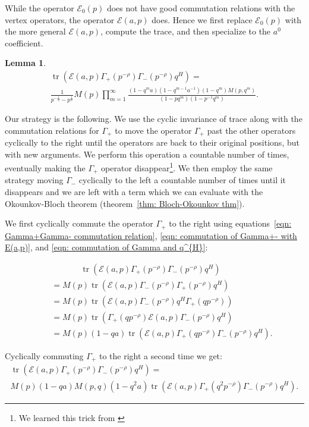 \documentclass[12pt]{amsart}
\newcommand{\half}{\frac{1}{2}}
\newtheorem{lemma}[theorem]{Lemma}
\theoremstyle{definition}
\newcommand{\tr}{\operatorname{tr}}
\newcommand{\E}{\mathcal{E}}
\newcommand{\ptotheminusrho}{p^{-\rho}}
\begin{document}
While the operator $\E_{0}(p)$ does not have good commutation
relations with the vertex operators, the operator $\E (a,p)$
does. Hence we first replace $\E_{0}(p)$ with the more general $\E
(a,p)$, compute the trace, and then specialize to the $a^{0}$
coefficient.
\begin{lemma}\label{lem: trace of E Gamma+Gamma-q^{H}}
\begin{multline*}
\tr \left(\E (a,p)\Gamma_{+}(\ptotheminusrho )\Gamma_{-}(\ptotheminusrho )q^{H}
\right) = \\
\frac{1}{p^{-\half}-p^{\half}}M(p)\prod_{m=1}^{\infty}
\frac{(1-q^{m}a)(1-q^{m-1}a^{-1})(1-q^{m})
M(p,q^{m})}{(1-pq^{m})(1-p^{-1}q^{m})}.
\end{multline*}
\end{lemma}
\proof Our strategy is the following. We use the cyclic invariance of
trace along with the commutation relations for $\Gamma_{+}$ to move
the operator $\Gamma_{+}$ past the other operators cyclically to the
right until the operators are back to their original positions, but
with new arguments. We perform this operation a countable number of
times, eventually making the $\Gamma_{+}$ operator
disappear\footnote{We learned this trick from
\cite{Bouttier-Chapuy-Corteel}}. We then employ the same strategy
moving $\Gamma_{-}$ cyclically to the left a countable number of times
until it disappears and we are left with a term which we can evaluate
with the Okounkov-Bloch theorem (theorem~\ref{thm: Bloch-Okounkov
thm}).

We first cyclically commute the operator $\Gamma_{+}$ to the right
using equations~\eqref{eqn: Gamma+Gamma- commutation relation},
\eqref{eqn: commutation of Gamma+- with E(a,p)}, and \eqref{eqn:
commutation of Gamma and q^{H}}:

\begin{align*}
\quad &\quad \quad \quad \,\,\, \tr (\E (a,p)\Gamma_{+}(\ptotheminusrho)\Gamma_{-}(\ptotheminusrho
)q^{H})\\
& = M(p)\tr (\E (a,p)\Gamma_{-}(\ptotheminusrho)\Gamma_{+}(\ptotheminusrho
)q^{H})\\
& = M(p)\tr (\E (a,p)\Gamma_{-}(\ptotheminusrho)q^{H}\Gamma_{+}(q\ptotheminusrho
))\\
& = M(p)\tr (\Gamma_{+}(q\ptotheminusrho
)\E (a,p)\Gamma_{-}(\ptotheminusrho)q^{H})\\
& = M(p)(1-qa)\tr (\E (a,p)\Gamma_{+}(q\ptotheminusrho) \Gamma_{-}(\ptotheminusrho)q^{H}).
\end{align*}

Cyclically commuting $\Gamma_{+}$ to the right a second time we get:
\begin{multline*}
 \tr (\E (a,p)\Gamma_{+}(\ptotheminusrho)\Gamma_{-}(\ptotheminusrho
)q^{H}) = \\
M(p)(1-qa)M(p,q)(1-q^{2}a) \tr (\E (a,p)\Gamma_{+}(q^{2}\ptotheminusrho)\Gamma_{-}(\ptotheminusrho
)q^{H}).
\end{multline*}
\end{document}
